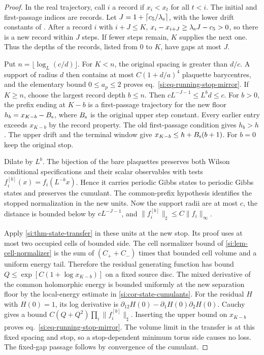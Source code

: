\documentclass[11pt,letterpaper,reqno]{amsart}
\numberwithin{equation}{section}
\renewcommand{\eqref}[1]{\textup{eq.~\ref{#1}}}
\theoremstyle{definition}
\theoremstyle{remark}
\begin{document}
\begin{proof}
In the real trajectory, call $i$ a record if $x_i<x_t$ for all
$t<i$. The initial and first-passage indices are records. Let
$J=1+\lceil c_5/\lambda_{\rm s}\rceil$, with the lower drift
constants of \cite[Theorem~A and Proposition~4.4]{RT}. After a record $i$ with $i+J\le K$,
$x_i-x_{i+J}\ge\lambda_{\rm s}J-c_5>0$, so there is a new record
within $J$ steps. If fewer steps remain, $K$ supplies the next one.
Thus the depths of the records, listed from $0$ to $K$, have gaps
at most $J$.

Put $n=\lfloor\log_L(c/d)\rfloor$. For $K<n$, the original spacing
is greater than $d/c$. A support of radius $d$ then contains at
most $C(1+d/a)^4$ plaquette barycentres, and the elementary bound
$0\le a_p\le2$ proves \eqref{si:eq-running-stop-mirror}. If $K\ge n$,
choose the largest record depth $b\le n$. Then
$c L^{-J-1}\le L^b d\le c$. For $b>0$, the prefix ending at $K-b$
is a first-passage trajectory for the new floor
$h_b=x_{K-b}-B_{\rm s}$, where $B_{\rm s}$ is the original upper
step constant. Every earlier entry exceeds $x_{K-b}$ by the
record property. The old first-passage condition gives $h_b>h$.
The upper drift and the terminal window give
$x_{K-b}\le h+B_{\rm s}(b+1)$. For $b=0$ keep the original stop.

Dilate by $L^b$. The bijection of the bare plaquettes preserves
both Wilson conditional specifications and their scalar
observables with tests $f_i^{[b]}(x)=f_i(L^{-b}x)$. Hence it carries
periodic Gibbs states to periodic Gibbs states and preserves the
cumulant. The common-prefix hypothesis identifies the stopped
normalization in the new units. Now the support radii are at most
$c$, the distance is bounded below by $c L^{-J-1}$, and
$\|f_i^{[b]}\|_\sharp\le C\|f_i\|_\infty$.

Apply \cref{si:thm-state-transfer} in these units at the new stop.
Its proof uses at most two occupied cells of bounded side. The
cell normalizer bound of \cref{si:lem-cell-normalizer} is the sum
of $(C_++C_-)$ times that bounded cell volume and a uniform
energy tail. Therefore the residual generating function has
bound $Q\le\exp[C(1+\log x_{K-b})]$ on a fixed source disc.
The mixed derivative of the common holomorphic energy is bounded
uniformly at the new separation floor by the local-energy
estimate in \cref{si:cor-state-cumulants}. For the residual $H$
with $H(0)=1$, its log derivative is
$\partial_{12}H(0)-\partial_1H(0)\partial_2H(0)$. Cauchy gives
a bound $C(Q+Q^2)\prod_i\|f_i^{[b]}\|_\sharp$. Inserting the
upper bound on $x_{K-b}$ proves \eqref{si:eq-running-stop-mirror}.
The volume limit in the transfer is at this fixed spacing and
stop, so a stop-dependent minimum torus side causes no loss.
The fixed-gap passage follows by convergence of the cumulant.
\end{proof}
\end{document}
